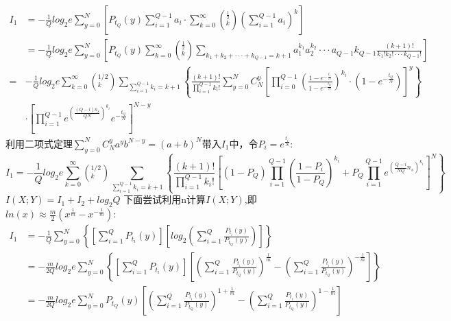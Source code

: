 \documentclass[12pt]{article}
\begin{document}
\begin{equation*}
  \begin{aligned}
    I_1 &= -\frac{1}{Q}log_2e\sum\limits_{y=0}^{N}\left[P_{t_Q}(y)\sum\limits_{i=1}^{Q-1}a_i·\sum\limits_{k=0}^{\infty}\left(^{\frac{1}{2}}_k\right)\left(\sum\limits_{i=1}^{Q-1}a_i\right)^{k}\right] \\
    &= -\frac{1}{Q}log_2e\sum\limits_{y=0}^{N}\left[P_{t_Q}(y)\sum\limits_{k=0}^{\infty}\left(^{\frac{1}{2}}_k\right)\sum\limits_{k_1+k_2+···+k_{Q-1}=k+1}a_1^{k_1}a_2^{k_2}···a_{Q-1}k_{Q-1}\frac{(k+1)!}{k_1!k_2!···k_{Q-1}!}\right] \\
    =& -\frac{1}{Q}log_2e\sum\limits_{k=0}^{\infty}\left(^{1/2}_k\right)\sum\limits_{\sum_{i=1}^{Q-1}k_i=k+1}\left\{\frac{(k+1)!}{\prod_{i=1}^{Q-1}k_i!}\sum\limits_{y=0}^NC_N^y\left[\prod_{i=0}^{Q-1}\left(\frac{1-e^{-\frac{t_i}{N}}}{1-e^{-\frac{t_Q}{N}}}\right)^{k_i}·\left(1-e^{-\frac{t_Q}{N}}\right)\right]^y\right\} \\
    &·\left[\prod_{i=1}^{Q-1}e^{\left(\frac{(Q-i)n_s}{QN}\right)^{k_i}}e^{-\frac{t_Q}{N}}\right]^{N-y}
  \end{aligned}
\end{equation*}
利用二项式定理$\sum_{y=0}^NC_N^ya^yb^{N-y}=(a+b)^N$带入$I_1$中，令$P_i=e^{\frac{t_i}{N}}$:
$$I_1=-\frac{1}{Q}log_2e\sum\limits_{k=0}^\infty\left(^{1/2}_k\right)\sum\limits_{\sum_{i=1}^{Q-1}k_i=k+1}\left\{\frac{(k+1)!}{\prod_{i=1}^{Q-1}k_i!}\left[(1-P_Q)\prod_{i=1}^{Q-1}\left(\frac{1-P_i}{1-P_Q}\right)^{k_i}+P_Q\prod_{i=1}^{Q-1}e^{\left(\frac{Q-i}{NQ}n_s\right)^{k_i}}\right]^N\right\}$$
$I(X;Y)=I_1+I_2+log_2Q$
下面尝试利用n计算$I(X;Y)$,即$ln(x)\approx\frac{m}{2}\left(x^{\frac{1}{m}}-x^{-\frac{1}{m}}\right)$:
\begin{equation*}
  \begin{aligned}
    I_1 &= -\frac{1}{Q}\sum\limits_{y=0}^N\left\{\left[\sum\limits_{i=1}^QP_{t_i}(y)\right]\left[log_2\left(\sum\limits_{i=1}^Q\frac{P_{t_i}(y)}{P_{t_Q}(y)}\right)\right]\right\} \\
    &=-\frac{m}{2Q}log_2e\sum\limits_{y=0}^N\left\{\left[\sum\limits_{i=1}^QP_{t_i}(y)\right]\left[\left(\sum\limits_{i=1}^Q\frac{P_{t_i}(y)}{P_{t_Q}(y)}\right)^{\frac{1}{m}}-\left(\sum\limits_{i=1}^Q\frac{P_{t_i}(y)}{P_{t_Q}(y)}\right)^{-\frac{1}{m}}\right]\right\} \\
    &=-\frac{m}{2Q}log_2e\sum\limits_{y=0}^NP_{t_Q}(y)\left[\left(\sum\limits_{i=1}^Q\frac{P_{t_i}(y)}{P_{t_Q}(y)}\right)^{1+\frac{1}{m}}-\left(\sum\limits_{i=1}^Q\frac{P_{t_i}(y)}{P_{t_Q}(y)}\right)^{1-\frac{1}{m}}\right]
  \end{aligned}
\end{equation*}
\end{document}
